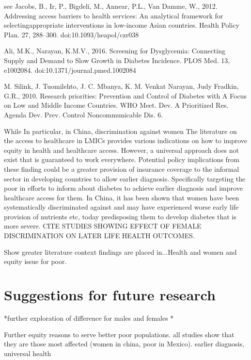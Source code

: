 see Jacobs, B., Ir, P., Bigdeli, M., Annear, P.L., Van Damme, W., 2012. Addressing access barriers to health services: An analytical framework for selectingappropriate interventions in low-income Asian countries. Health Policy Plan. 27, 288–300. doi:10.1093/heapol/czr038

Ali, M.K., Narayan, K.M.V., 2016. Screening for Dysglycemia: Connecting Supply and Demand to Slow Growth in Diabetes Incidence. PLOS Med. 13, e1002084. doi:10.1371/journal.pmed.1002084

M. Silink, J. Tuomilehto, J. C. Mbanya, K. M. Venkat Narayan, Judy Fradkin, G.R., 2010. Research priorities: Prevention and Control of Diabetes with A Focus on Low and Middle Income Countries. WHO Meet. Dev. A Prioritized Res. Agenda Dev. Prev. Control Noncommunicable Dis. 6.

 While  In particular, in China, discrimination against women The literature on the access to healthcare in \acp{LMIC} provides various indications on how to improve equity in health and healthcare access.  However, a universal approach does not exist that is guaranteed to work everywhere.  Potential policy implications from these finding could be a greater provision of insurance coverage to the informal sector in developing countries to allow earlier diagnosis. Specifically targeting the poor in efforts to inform about diabetes to achieve earlier diagnosis and improve healthcare access for them. In China, it has been shown that women have been systematically discriminated against and may have experienced worse early life provision of nutrients etc, today predisposing them to develop diabetes that is more severe. CITE STUDIES SHOWING EFFECT OF FEMALE DISCRIMINATION ON LATER LIFE HEALTH OUTCOMES. 

Show greater literature context findings are placed in...Health and women and equity issue for poor.

\section{Suggestions for future research}

*further exploration of difference for males and females
*




 Further  equity reasons to serve better poor populations. all studies show that they are those most affected (women in china, poor in Mexico). earlier diagnosis, universal health 









